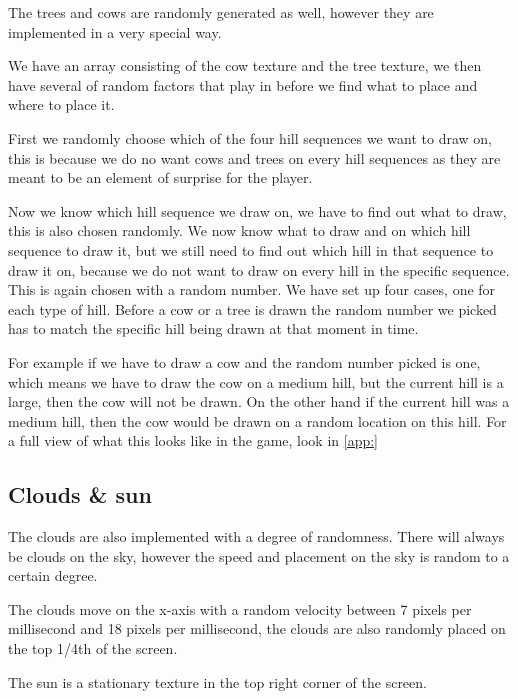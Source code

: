 The trees and cows are randomly generated as well, however they are implemented in a very special way. 

We have an array consisting of the cow texture and the tree texture, we then have several of random factors that play in before we find what to place and where to place it. 

First we randomly choose which of the four hill sequences we want to draw on, this is because we do no want cows and trees on every hill sequences as they are meant to be an element of surprise for the player. 

Now we know which hill sequence we draw on, we have to find out what to draw, this is also chosen randomly. We now know what to draw and on which hill sequence to draw it, but we still need to find out which hill in that sequence to draw it on, because we do not want to draw on every hill in the specific sequence. This is again chosen with a random number. We have set up four cases, one for each type of hill. Before a cow or a tree is drawn the random number we picked has to match the specific hill being drawn at that moment in time. 

For example if we have to draw a cow and the random number picked is one, which means we have to draw the cow on a medium hill, but the current hill is a large, then the cow will not be drawn. On the other hand if the current hill was a medium hill, then the cow would be drawn on a random location on this hill. For a full view of what this looks like in the game, look in \autoref{app:} 

\subsection{Clouds \& sun}

The clouds are also implemented with a degree of randomness. There will always be clouds on the sky, however the speed and placement on the sky is random to a certain degree. 

The clouds move on the x-axis with a random velocity between 7 pixels per millisecond and 18 pixels per millisecond, the clouds are also randomly placed on the top 1/4th of the screen. 

The sun is a stationary texture in the top right corner of the screen. 
